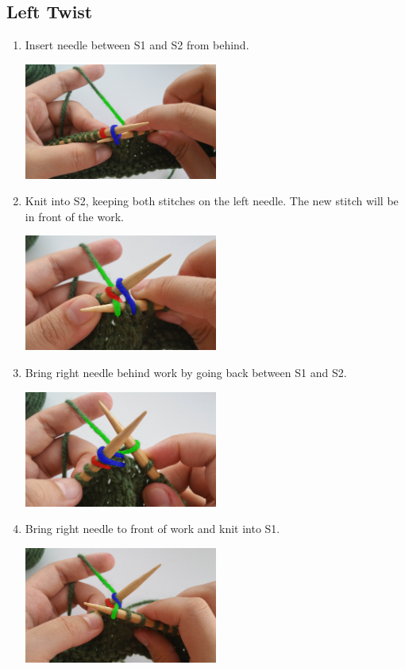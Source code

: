 \documentclass[12pt]{article}
\begin{document}
\subsection*{Left Twist}

\begin{multicols}{2}
\begin{enumerate}
\item Insert needle between S1 and S2 from behind.

\includegraphics[width=2.5in]{lt_step1.jpg}

\item Knit into S2, keeping both stitches on the left needle. The new stitch will be in front of the work.

\includegraphics[width=2.5in]{lt_step2.jpg}

\item Bring right needle behind work by going back between S1 and S2.

\includegraphics[width=2.5in]{lt_step3.jpg}

\vfill \columnbreak

\item Bring right needle to front of work and knit into S1.

\includegraphics[width=2.5in]{lt_step4.jpg}


\end{enumerate}
\end{multicols}
\end{document}
